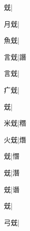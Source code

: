 \begin{multicols}{2}
{{兓}\mktsJzrVerticalBar{}{\cjk{}{\cnsym{}　}{\cnsym{}　}{\cnsym{}　}}|{}\par
{\cjk{}{\cnsym{}　}月兓}\mktsJzrVerticalBar{}{\cjk{}{\cnsym{}　}{\cnsym{}　}{\cnsym{}　}}|{}\par
{\cjk{}{\cnsym{}　}魚兓}\mktsJzrVerticalBar{}{\cjk{}{\cnsym{}　}{\cnsym{}　}{\cnsym{}　}}|{}\par
{\cjk{}{\cnsym{}　}言兓}\mktsJzrVerticalBar{}{\cjk{}{\cnsym{}　}{\cnsym{}　}{\cnsym{}　}}|{\cjk{}譖}\par
{言兓}\mktsJzrVerticalBar{}{\cjk{}{\cnsym{}　}{\cnsym{}　}{\cnsym{}　}}|{}\par
{\cjk{}{\cnsym{}　}疒兓}\mktsJzrVerticalBar{}{\cjk{}{\cnsym{}　}{\cnsym{}　}{\cnsym{}　}}|{}\par
{兓}\mktsJzrVerticalBar{}{\cjk{}{\cnsym{}　}{\cnsym{}　}{\cnsym{}　}}|{}\par
{\cjk{}{\cnsym{}　}米兓}\mktsJzrVerticalBar{}{\cjk{}{\cnsym{}　}{\cnsym{}　}{\cnsym{}　}}|{\cjk{}糣}\par
{\cjk{}{\cnsym{}　}火兓}\mktsJzrVerticalBar{}{\cjk{}{\cnsym{}　}{\cnsym{}　}{\cnsym{}　}}|{\cjk{}熸}\par
{兓}\mktsJzrVerticalBar{}{\cjk{}{\cnsym{}　}{\cnsym{}　}{\cnsym{}　}}|{\cjk{}憯}\par
{兓}\mktsJzrVerticalBar{}{\cjk{}{\cnsym{}　}{\cnsym{}　}{\cnsym{}　}}|{\cjk{}潛}\par
{兓}\mktsJzrVerticalBar{}{\cjk{}{\cnsym{}　}{\cnsym{}　}{\cnsym{}　}}|{\cjk{}谮}\par
{兓}\mktsJzrVerticalBar{}{\cjk{}{\cnsym{}　}{\cnsym{}　}{\cnsym{}　}}|{}\par
{\cjk{}{\cnsym{}　}弓兓}\mktsJzrVerticalBar{}{\cjk{}{\cnsym{}　}{\cnsym{}　}{\cnsym{}　}}|{}\par
}
\end{multicols}

